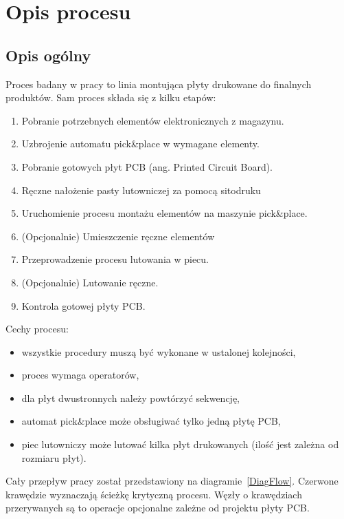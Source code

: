 \chapter{Opis procesu}

\section{Opis ogólny}
Proces badany w pracy to linia montująca płyty drukowane do finalnych produktów.
Sam proces składa się z kilku etapów:
\begin{enumerate}
	\item Pobranie potrzebnych elementów elektronicznych z magazynu.
	\item Uzbrojenie automatu pick\&place w wymagane elementy.
	\item Pobranie gotowych płyt PCB (ang. Printed Circuit Board).
	\item Ręczne nałożenie pasty lutowniczej za pomocą sitodruku
	\item Uruchomienie procesu montażu elementów na maszynie pick\&place.
	\item (Opcjonalnie) Umieszczenie ręczne elementów
	\item Przeprowadzenie procesu lutowania w piecu.
	\item (Opcjonalnie) Lutowanie ręczne.
	\item Kontrola gotowej płyty PCB\@.
\end{enumerate}

Cechy procesu:
\begin{itemize}
	\item wszystkie procedury muszą być wykonane w ustalonej kolejności,
	\item proces wymaga operatorów,
	\item dla płyt dwustronnych należy powtórzyć sekwencję,
	\item automat pick\&place może obsługiwać tylko jedną płytę PCB,
	\item piec lutowniczy może lutować kilka płyt drukowanych (ilość jest zależna od rozmiaru płyt).
\end{itemize}

Cały przepływ pracy został przedstawiony na diagramie~\ref{DiagFlow}.
Czerwone krawędzie wyznaczają ścieżkę krytyczną procesu.
Węzły o krawędziach przerywanych są to operacje opcjonalne zależne od projektu płyty PCB\@.

